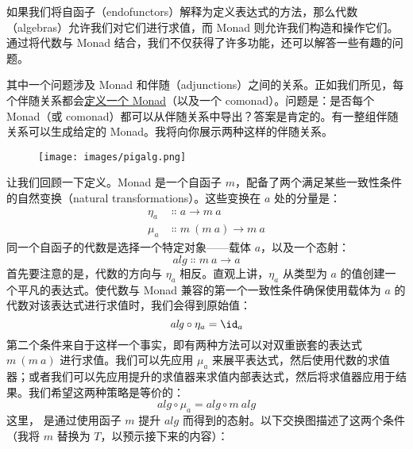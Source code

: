 
\lettrine[lhang=0.17]{如}{果我们将}自函子（endofunctors）解释为定义表达式的方法，那么代数（algebras）允许我们对它们进行求值，而 Monad 则允许我们构造和操作它们。通过将代数与 Monad 结合，我们不仅获得了许多功能，还可以解答一些有趣的问题。

其中一个问题涉及 Monad 和伴随（adjunctions）之间的关系。正如我们所见，每个伴随关系都会\hyperref[monads-categorically]{定义一个 Monad}（以及一个 comonad）。问题是：是否每个 Monad（或 comonad）都可以从伴随关系中导出？答案是肯定的。有一整组伴随关系可以生成给定的 Monad。我将向你展示两种这样的伴随关系。

\begin{figure}[H]
  \centering
  \texttt{[image: images/pigalg.png]}
\end{figure}

\noindent
让我们回顾一下定义。Monad 是一个自函子 $m$，配备了两个满足某些一致性条件的自然变换（natural transformations）。这些变换在 $a$ 处的分量是：
\begin{align*}
  \eta_a & \Colon a \to m\ a         \\
  \mu_a  & \Colon m\ (m\ a) \to m\ a
\end{align*}
同一个自函子的代数是选择一个特定对象——载体 $a$，以及一个态射：
\[\mathit{alg} \Colon m\ a \to a\]
首先要注意的是，代数的方向与 $\eta_a$ 相反。直观上讲，$\eta_a$ 从类型为 $a$ 的值创建一个平凡的表达式。使代数与 Monad 兼容的第一个一致性条件确保使用载体为 $a$ 的代数对该表达式进行求值时，我们会得到原始值：
\[\mathit{alg} \circ \eta_a = \id_a\]
第二个条件来自于这样一个事实，即有两种方法可以对双重嵌套的表达式 $m\ (m\ a)$ 进行求值。我们可以先应用 $\mu_a$ 来展平表达式，然后使用代数的求值器；或者我们可以先应用提升的求值器来求值内部表达式，然后将求值器应用于结果。我们希望这两种策略是等价的：
\[\mathit{alg} \circ \mu_a = \mathit{alg} \circ m\ \mathit{alg}\]
这里， 是通过使用函子 $m$ 提升 $\mathit{alg}$ 而得到的态射。以下交换图描述了这两个条件（我将 $m$ 替换为 $T$，以预示接下来的内容）：

\begin{figure}[H]
  \centering
  \begin{subfigure}
    \centering
  \end{subfigure}
  \hspace{1cm}
  \begin{subfigure}
    \centering
  \end{subfigure}
\end{figure}

